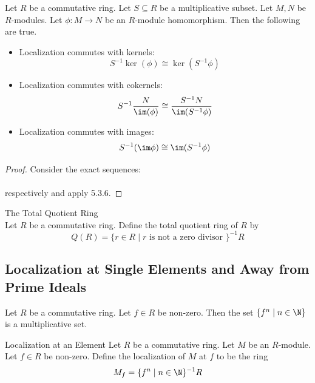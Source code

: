 \documentclass[a4paper]{article}
\begin{document}
\begin{lmm}{}{} Let $R$ be a commutative ring. Let $S\subseteq R$ be a multiplicative subset. Let $M,N$ be $R$-modules. Let $\phi:M\to N$ be an $R$-module homomorphism. Then the following are true. 
\begin{itemize}
\item Localization commutes with kernels: $$S^{-1}\ker(\phi)\cong\ker(S^{-1}\phi)$$
\item Localization commutes with cokernels: $$S^{-1}\frac{N}{\im(\phi)}\cong\frac{S^{-1}N}{\im(S^{-1}\phi)}$$
\item Localization commutes with images: $$S^{-1}(\im\phi)\cong\im(S^{-1}\phi)$$
\end{itemize} 
\begin{proof}
Consider the exact sequences: \\
\\
respectively and apply 5.3.6. 
\end{proof}
\end{lmm}

\begin{defn}{The Total Quotient Ring}{}\\
Let $R$ be a commutative ring. Define the total quotient ring of $R$ by $$Q(R)=\{r\in R\;|\;r\text{ is not a zero divisor }\}^{-1}R$$
\end{defn}

\subsection{Localization at Single Elements and Away from Prime Ideals}
\begin{lmm}{}{} Let $R$ be a commutative ring. Let $f\in R$ be non-zero. Then the set $\{f^n\;|\;n\in\N\}$ is a multiplicative set. 
\end{lmm}

\begin{defn}{Localization at an Element}{} Let $R$ be a commutative ring. Let $M$ be an $R$-module. Let $f\in R$ be non-zero. Define the localization of $M$ at $f$ to be the ring $$M_f=\{f^n\;|\;n\in\N\}^{-1}R$$
\end{defn}
\end{document}
